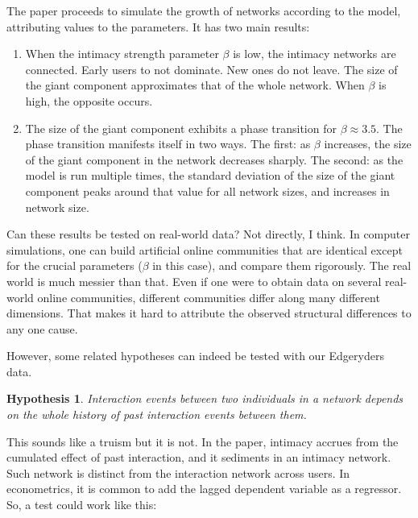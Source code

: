 \documentclass{article}
\begin{document}
The paper proceeds to simulate the growth of networks according to the model, attributing values to the parameters. It has two main results:

\begin{enumerate}
	\item When the intimacy strength parameter $\beta$ is low, the intimacy networks are connected. Early users to not dominate. New ones do not leave. The size of the giant component approximates that of the whole network. When $\beta$ is high, the opposite occurs. 
	\item The size of the giant component exhibits a phase transition for $\beta \approx 3.5$. The phase transition manifests itself in two ways. The first: as $\beta$ increases, the size of the giant component in the network decreases sharply. The second: as the model is run multiple times, the standard deviation of the size of the giant component peaks around that value for all network sizes, and increases in network size. 
\end{enumerate}



Can these results be tested on real-world data? Not directly, I think. In computer simulations, one can build artificial online communities that are identical except for the crucial parameters ($\beta$ in this case), and compare them rigorously. The real world is much messier than that. Even if one were to obtain data on several real-world online communities, different communities differ along many different dimensions. That makes it hard to attribute the observed structural differences to any one cause. 

However, some related hypotheses can indeed be tested with our Edgeryders data.

\newtheorem{intimacy}{Hypothesis}

\begin{intimacy}
	Interaction events between two individuals in a network depends on the whole history of past interaction events between them.
	\label{hypothesis:intimacyWorks}
\end{intimacy}

This sounds like a truism but it is not. In the paper, intimacy accrues from the cumulated effect of past interaction, and it sediments in an intimacy network. Such network is distinct from the interaction network across users. In econometrics, it is common to add the lagged dependent variable as a regressor.  So, a test could work like this:
\end{document}
